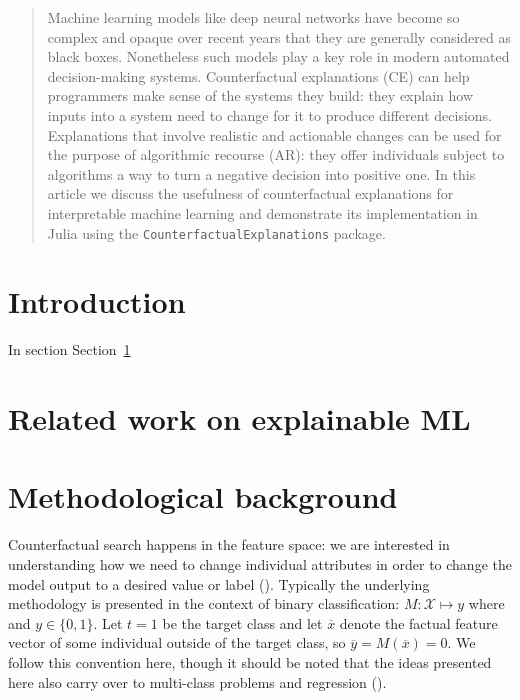 \documentclass{juliacon}
\begin{document}


\maketitle

\begin{abstract}

Machine learning models like deep neural networks have become so complex and opaque over recent years that they are generally considered as black boxes. Nonetheless such models play a key role in modern automated decision-making systems. Counterfactual explanations (CE) can help programmers make sense of the systems they build: they explain how inputs into a system need to change for it to produce different decisions. Explanations that involve realistic and actionable changes can be used for the purpose of algorithmic recourse (AR): they offer individuals subject to algorithms a way to turn a negative decision into positive one. In this article we discuss the usefulness of counterfactual explanations for interpretable machine learning and demonstrate its implementation in Julia using the \verb|CounterfactualExplanations| package.

\end{abstract}

\hypertarget{sec-intro}{%
\section{Introduction}\label{sec-intro}}

In section Section~\ref{sec-intro}

\hypertarget{related-work-on-explainable-ml}{%
\section{Related work on explainable
ML}\label{related-work-on-explainable-ml}}

\hypertarget{sec-method}{%
\section{Methodological background}\label{sec-method}}

Counterfactual search happens in the feature space: we are interested in
understanding how we need to change individual attributes in order to
change the model output to a desired value or label
(\cite{molnar2020interpretable}). Typically the underlying methodology
is presented in the context of binary classification:
\(M: \mathcal{X} \mapsto y\) where and \(y\in\{0,1\}\). Let \(t=1\) be
the target class and let \(\overline{x}\) denote the factual feature
vector of some individual outside of the target class, so
\(\overline{y}=M(\overline{x})=0\). We follow this convention here,
though it should be noted that the ideas presented here also carry over
to multi-class problems and regression (\cite{molnar2020interpretable}).
\end{document}
